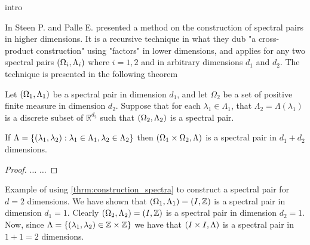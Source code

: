 \documentclass[../thesis.tex]{subfiles}
\begin{document}
intro %


In \cite{jorgensenSpectralPairsCartesian2001} Steen P. and Palle E. presented a method on the construction of spectral pairs in higher dimensions. It is a recursive technique in what they dub "a cross-product construction" using "factors" in lower dimensions, and applies for any two spectral pairs $\left(\Omega_i,\Lambda_i\right)$ where $i=1,2$ and in arbitrary dimensions $d_1$ and $d_2$. The technique is presented in the following theorem

\begin{theorem} \label{thrm:construction_spectra} %
    Let $\left(\Omega_1,\Lambda_1\right)$ be a spectral pair in dimension $d_1$, and let $\Omega_2$ be a set of positive finite measure in dimension $d_2$. Suppose that for each $\lambda_1 \in \Lambda_1$, that $\Lambda_2=\Lambda(\lambda_1)$ is a discrete subset of $\mathbb{R}^{d_2}$ such that $\left(\Omega_2,\Lambda_2\right)$ is a spectral pair.

    If $\Lambda=\left\{\left(\lambda_1,\lambda_2\right): \lambda_1\in \Lambda_1, \lambda_2 \in \Lambda_2\right\}$ then $\left(\Omega_1\times\Omega_2, \Lambda\right)$ is a spectral pair in $d_1+d_2$ dimensions. 
\end{theorem}
\begin{proof}
    $\dots$
    $\dots$
\end{proof}


\begin{example}
    Example of using \cref{thrm:construction_spectra} to construct a spectral pair for $d=2$ dimensions. 
    We have shown that $\left(\Omega_1,\Lambda_1\right) = \left(I, \mathbb{Z}\right)$ is a spectral pair in dimension $d_1=1$. Clearly $\left(\Omega_2,\Lambda_2\right) = \left(I, \mathbb{Z}\right)$ is a spectral pair in dimension $d_2=1$. Now, since $\Lambda  = \left\{\left(\lambda_1,\lambda_2\right)\in \mathbb{Z} \times \mathbb{Z} \right\}$ we have that $\left(I \times I, \Lambda\right)$ is a spectral pair in $1+1=2$ dimensions.

    
\end{example}
\end{document}
